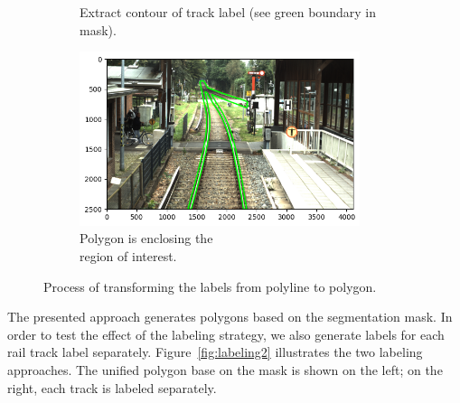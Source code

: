 \documentclass[Master,MDS,english]{BASE/twbook} %
\begin{document}
\begin{figure}
\begin{subfigure}[t]{.5\textwidth}
  \caption{Extract contour of track label (see green boundary in mask).}
\end{subfigure}%
\begin{subfigure}[t]{.5\textwidth}
  \centering
  \includegraphics[width=0.9\textwidth]{images/labeling/final}
  \caption{Polygon is enclosing the \\ region of interest.}
\end{subfigure}
\caption{Process of transforming the labels from  polyline to polygon.}
\label{fig:labeling}
\end{figure}


The presented approach generates polygons based on the segmentation mask. In order to test the effect of the labeling strategy, we also generate labels for each rail track label separately. Figure~\ref{fig:labeling2} illustrates the two labeling approaches. The unified polygon base on the mask is shown on the left; on the right, each track is labeled separately.
\end{document}
